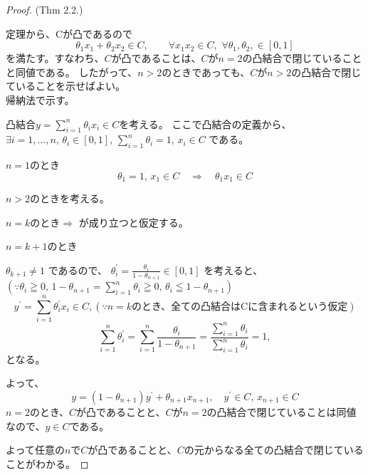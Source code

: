 \documentclass[12pt]{jsarticle}
\begin{document}
\begin{proof}(Thm 2.2.)

定理から、Cが凸であるので
\[
\theta_1 x_1 +  \theta _2 x_2  \in C, \qquad \forall x_1   x_2  \in C,  \,\,
\forall \theta_1, \theta_2,  \in [0, 1]
\]
を満たす。すなわち、$C$が凸であることは、$C$が$n=2$の凸結合で閉じていることと同値である。
したがって、$n >2$のときであっても、$C$が$n>2$の凸結合で閉じていることを示せばよい。\\

帰納法で示す。

凸結合$y =  \sum \limits_{i=1}^n \theta_i x_i  \in C$を考える。
ここで凸結合の定義から、
$\exists i = 1,...,n,  \, \theta_i \in[0,1],\, \sum \limits_{i=1}^n \theta_i =1, \, x_i \in C$
である。

$n=1$のとき
\[
\theta_1 = 1, \,  x_1 \in C \quad \Rightarrow\quad  \theta_1x_1 \in C
\]

$n >2$のときを考える。

$n=k$のとき$\Rightarrow$ が成り立つと仮定する。

$n=k+1$のとき

$\theta_{k+1} \ne 1$
であるので、
$\theta_i^{\prime} = \frac{\theta_i}{1 - \theta_{n+1}}\in [0,1] $
を考えると、
$(\because \theta_i \geqq 0,\, 1 - \theta_{n+1} = \sum \limits_{i=1}^n \theta_i \geqq 0, \, \theta_i \leqq 1 - \theta_{n+1})$
\[
y^{\prime} = \sum \limits_{i=1}^n \theta_i^{\prime} x_i \in C, ( \because n = k\text {のとき、全ての凸結合はCに含まれるという仮定})
\]
\[
\sum \limits_{i=1}^n \theta_i^{\prime}= \sum \limits_{i=1}^n  \frac{\theta_i}{1-\theta_{n+1}} =  \frac{\sum \limits_{i=1}^n \theta_i }{\sum \limits_{i=1}^n \theta_i}=1, 
\]
となる。

よって、
\[
y = (1 - \theta_{n+1}) y^{\prime} + \theta_{n+1} x_{n+1}, \quad y^{\prime} \in C, \, x_{n+1} \in C
\]
$n=2$のとき、$C$が凸であることと、$C$が$n=2$の凸結合で閉じていることは同値なので、$y \in C$である。

よって任意の$n$で$C$が凸であることと、$C$の元からなる全ての凸結合で閉じていることがわかる。

\end{proof}
\end{document}
